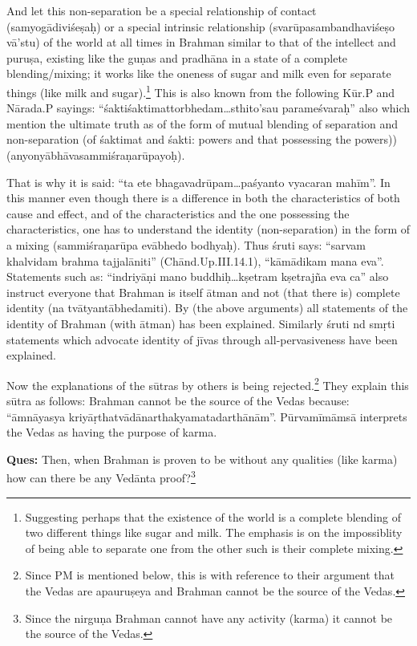 And let this non-separation be a special relationship of contact (samyogādiviśeṣaḥ) or a special intrinsic relationship (svarūpasambandhaviśeṣo vā’stu) of the world at all times in Brahman similar to that of the intellect and puruṣa, existing like the guṇas and pradhāna in a state of a complete blending/mixing; it works like the oneness of sugar and milk even for separate things (like milk and sugar).\footnote{Suggesting perhaps that the existence of the world is a complete blending of two different things like sugar and milk. The emphasis is on the impossiblity of being able to separate one from the other such is their complete mixing.} This is also known from the following Kūr.P and Nārada.P sayings: “śaktiśaktimattorbhedam…sthito’sau parameśvaraḥ” also which mention the ultimate truth as of the form of mutual blending of separation and non-separation (of śaktimat and śakti: powers and that possessing the powers)) (anyonyābhāvasammiśraṇarūpayoḥ).

That is why it is said: “ta ete bhagavadrūpam…paśyanto vyacaran mahīm”. In this manner even though there is a difference in both the characteristics of both cause and effect, and of the characteristics and the one possessing the characteristics, one has to understand the identity (non-separation) in the form of a mixing (sammiśraṇarūpa evābhedo bodhyaḥ). Thus śruti says: “sarvam khalvidam brahma tajjalāniti” (Chānd.Up.III.14.1), “kāmādikam mana eva”. Statements such as: “indriyāṇi mano buddhiḥ…kṣetram kṣetrajña eva ca” also instruct everyone that Brahman is itself ātman and not (that there is) complete identity (na tvātyantābhedamiti). By (the above arguments) all statements of the identity of Brahman (with ātman) has been explained. Similarly śruti nd smṛti statements which advocate identity of jīvas through all-pervasiveness have been explained.

Now the explanations of the sūtras by others is being rejected.\footnote{Since PM is mentioned below, this is with reference to their argument that the Vedas are apauruṣeya and Brahman cannot be the source of the Vedas.} They explain this sūtra as follows: Brahman cannot be the source of the Vedas because: “āmnāyasya kriyāṛthatvādānarthakyamatadarthā\-nām”. Pūrvamīmāmsā interprets the Vedas as having the purpose of karma. 

\textbf{Ques:} Then, when Brahman is proven to be without any qualities (like karma) how can there be any Vedānta proof?\footnote{Since the nirguṇa Brahman cannot have any activity (karma) it cannot be the source of the Vedas.}

